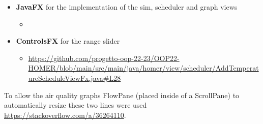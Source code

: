 \begin{itemize}
\begin{itemize}
    \end{itemize}
    \item \textbf{JavaFX} for the implementation of the sim, scheduler and graph views
    \begin{itemize}
        \item 
    \end{itemize}
    \item \textbf{ControlsFX} for the range slider
    \begin{itemize}
        \item \url{https://github.com/progetto-oop-22-23/OOP22-HOMER/blob/main/src/main/java/homer/view/scheduler/AddTemperatureScheduleViewFx.java#L28}
    \end{itemize}
\end{itemize}

To allow the air quality graphs FlowPane (placed inside of a ScrollPane) to automatically resize these two lines were used \url{https://stackoverflow.com/a/36264110}.
